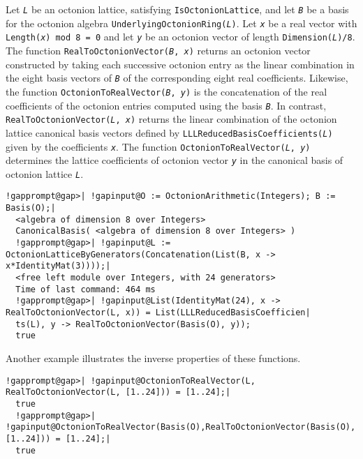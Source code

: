 \documentclass[a4paper,11pt]{report}
\begin{document}
{{{ Let \mbox{\texttt{\mdseries\slshape L}} be an octonion lattice, satisfying \texttt{IsOctonionLattice}, and let \mbox{\texttt{\mdseries\slshape B}} be a basis for the octonion algebra \texttt{UnderlyingOctonionRing(\mbox{\texttt{\mdseries\slshape L}})}. Let \mbox{\texttt{\mdseries\slshape x}} be a real vector with \texttt{Length(\mbox{\texttt{\mdseries\slshape x}}) mod 8 = 0} and let \mbox{\texttt{\mdseries\slshape y}} be an octonion vector of length \texttt{Dimension(\mbox{\texttt{\mdseries\slshape L}})/8}. The function \texttt{RealToOctonionVector(\mbox{\texttt{\mdseries\slshape B}}, \mbox{\texttt{\mdseries\slshape x}})} returns an octonion vector constructed by taking each successive octonion
entry as the linear combination in the eight basis vectors of \mbox{\texttt{\mdseries\slshape B}} of the corresponding eight real coefficients. Likewise, the function \texttt{OctonionToRealVector(\mbox{\texttt{\mdseries\slshape B}}, \mbox{\texttt{\mdseries\slshape y}})} is the concatenation of the real coefficients of the octonion entries computed
using the basis \mbox{\texttt{\mdseries\slshape B}}. In contrast, \texttt{RealToOctonionVector(\mbox{\texttt{\mdseries\slshape L}}, \mbox{\texttt{\mdseries\slshape x}})} returns the linear combination of the octonion lattice canonical basis vectors
defined by \texttt{LLLReducedBasisCoefficients(\mbox{\texttt{\mdseries\slshape L}})} given by the coefficients \mbox{\texttt{\mdseries\slshape x}}. The function \texttt{OctonionToRealVector(\mbox{\texttt{\mdseries\slshape L}}, \mbox{\texttt{\mdseries\slshape y}})} determines the lattice coefficients of octonion vector \mbox{\texttt{\mdseries\slshape y}} in the canonical basis of octonion lattice \mbox{\texttt{\mdseries\slshape L}}. 
\begin{Verbatim}[commandchars=!@|,fontsize=\small,frame=single,label=Example]
  !gapprompt@gap>| !gapinput@O := OctonionArithmetic(Integers); B := Basis(O);|
  <algebra of dimension 8 over Integers>
  CanonicalBasis( <algebra of dimension 8 over Integers> )
  !gapprompt@gap>| !gapinput@L := OctonionLatticeByGenerators(Concatenation(List(B, x -> x*IdentityMat(3))));|
  <free left module over Integers, with 24 generators>
  Time of last command: 464 ms
  !gapprompt@gap>| !gapinput@List(IdentityMat(24), x -> RealToOctonionVector(L, x)) = List(LLLReducedBasisCoefficien|
  ts(L), y -> RealToOctonionVector(Basis(O), y));
  true
\end{Verbatim}
 Another example illustrates the inverse properties of these functions. 
\begin{Verbatim}[commandchars=!@|,fontsize=\small,frame=single,label=Example]
  !gapprompt@gap>| !gapinput@OctonionToRealVector(L, RealToOctonionVector(L, [1..24])) = [1..24];|
  true
  !gapprompt@gap>| !gapinput@OctonionToRealVector(Basis(O),RealToOctonionVector(Basis(O), [1..24])) = [1..24];|
  true
\end{Verbatim}
 }

 }

 }
\end{document}

